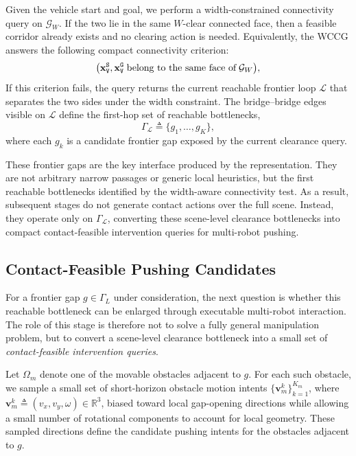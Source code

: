 Given the vehicle start and goal, we perform a width-constrained connectivity
query on $\mathcal{G}_W$. If the two lie in the same $W$-clear connected face, then a
feasible corridor already exists and no clearing action is needed. Equivalently,
the WCCG answers the following compact connectivity criterion:
\begin{equation}\label{eq:wccg-criterion}
  \big{(}\mathbf{x}_\texttt{V}^{\texttt{S}},\mathbf{x}_\texttt{V}^{\texttt{G}}
  \; \text{belong to the same face of}\; \mathcal{G}_W\big{)},
\end{equation}
If this criterion fails, the query returns the current reachable frontier loop
$\mathcal{L}$ that separates the two sides under the width constraint. The
bridge--bridge edges visible on $\mathcal{L}$ define the first-hop set of
reachable bottlenecks,
\begin{equation}
\Gamma_{\mathcal{L}} \triangleq \{g_1, \ldots, g_K\},
\end{equation}
where each $g_k$ is a candidate frontier gap exposed by the current clearance
query.

These frontier gaps are the key interface produced by the representation. They
are not arbitrary narrow passages or generic local heuristics, but the first
reachable bottlenecks identified by the width-aware connectivity test. As a
result, subsequent stages do not generate contact actions over the full scene.
Instead, they operate only on $\Gamma_{\mathcal{L}}$, converting these
scene-level clearance bottlenecks into compact contact-feasible intervention
queries for multi-robot pushing.

\subsection{Contact-Feasible Pushing Candidates}
\label{subsec:modes}

For a frontier gap $g \in \Gamma_L$ under consideration, the next question is
whether this reachable bottleneck can be enlarged through executable
multi-robot interaction. The role of this stage is therefore not to solve a
fully general manipulation problem, but to convert a scene-level clearance
bottleneck into a small set of \emph{contact-feasible intervention queries}.

Let $\Omega_m$ denote one of the movable obstacles adjacent to $g$. For each
such obstacle, we sample a small set of short-horizon obstacle motion intents
$\{\mathbf{v}_m^k\}_{k=1}^{K_m}$, where
$\mathbf{v}_m^k \triangleq (v_x,v_y,\omega)\in\mathbb{R}^3$, biased toward
local gap-opening directions while allowing a small number of rotational
components to account for local geometry. These sampled directions define the
candidate pushing intents for the obstacles adjacent to $g$.

